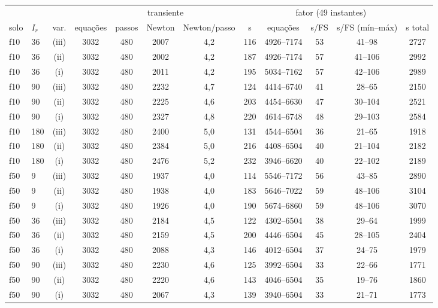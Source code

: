 \begin{tabular}{llc ccccc ccc c}
\toprule
 & & & \multicolumn{5}{c}{transiente} & \multicolumn{3}{c}{fator (49 instantes)} & \\
\cmidrule(lr){4-8}\cmidrule(lr){9-11}
solo & $I_r$ & var. & equações & passos & Newton & Newton/passo & s & equações & s/FS & s/FS (mín--máx) & s total\\
\midrule
f10 & 36 & (iii) & 3032 & 480 & 2007 & 4{,}2 & 116 & 4926--7174 & 53 & 41--98 & 2727\\
f10 & 36 & (ii) & 3032 & 480 & 2002 & 4{,}2 & 187 & 4926--7174 & 57 & 41--106 & 2992\\
f10 & 36 & (i) & 3032 & 480 & 2011 & 4{,}2 & 195 & 5034--7162 & 57 & 42--106 & 2989\\
f10 & 90 & (iii) & 3032 & 480 & 2232 & 4{,}7 & 124 & 4414--6740 & 41 & 28--65 & 2150\\
f10 & 90 & (ii) & 3032 & 480 & 2225 & 4{,}6 & 203 & 4454--6630 & 47 & 30--104 & 2521\\
f10 & 90 & (i) & 3032 & 480 & 2327 & 4{,}8 & 220 & 4614--6748 & 48 & 29--103 & 2584\\
f10 & 180 & (iii) & 3032 & 480 & 2400 & 5{,}0 & 131 & 4544--6504 & 36 & 21--65 & 1918\\
f10 & 180 & (ii) & 3032 & 480 & 2384 & 5{,}0 & 216 & 4408--6504 & 40 & 21--104 & 2182\\
f10 & 180 & (i) & 3032 & 480 & 2476 & 5{,}2 & 232 & 3946--6620 & 40 & 22--102 & 2189\\
\midrule
f50 & 9 & (iii) & 3032 & 480 & 1937 & 4{,}0 & 114 & 5546--7172 & 56 & 43--85 & 2890\\
f50 & 9 & (ii) & 3032 & 480 & 1938 & 4{,}0 & 183 & 5646--7022 & 59 & 48--106 & 3104\\
f50 & 9 & (i) & 3032 & 480 & 1926 & 4{,}0 & 190 & 5674--6860 & 59 & 48--106 & 3070\\
f50 & 36 & (iii) & 3032 & 480 & 2184 & 4{,}5 & 122 & 4302--6504 & 38 & 29--64 & 1999\\
f50 & 36 & (ii) & 3032 & 480 & 2159 & 4{,}5 & 200 & 4446--6504 & 45 & 28--105 & 2404\\
f50 & 36 & (i) & 3032 & 480 & 2088 & 4{,}3 & 146 & 4012--6504 & 37 & 24--75 & 1979\\
f50 & 90 & (iii) & 3032 & 480 & 2230 & 4{,}6 & 125 & 3992--6504 & 33 & 22--66 & 1771\\
f50 & 90 & (ii) & 3032 & 480 & 2220 & 4{,}6 & 143 & 4046--6504 & 35 & 19--76 & 1860\\
f50 & 90 & (i) & 3032 & 480 & 2067 & 4{,}3 & 139 & 3940--6504 & 33 & 21--71 & 1773\\

\end{tabular}

